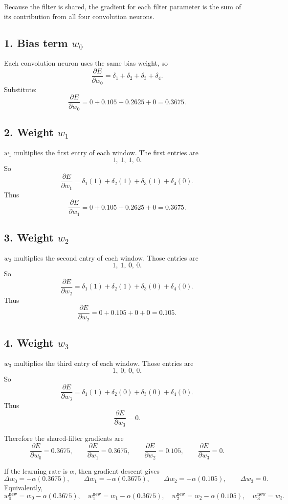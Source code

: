 \documentclass[11pt]{article}
\begin{document}
Because the filter is shared, the gradient for each filter parameter is the sum of its contribution from all four convolution neurons.

\subsection*{1. Bias term \(w_0\)}

Each convolution neuron uses the same bias weight, so
\[
\frac{\partial E}{\partial w_0}
=
\delta_1+\delta_2+\delta_3+\delta_4.
\]
Substitute:
\[
\frac{\partial E}{\partial w_0}
=0+0.105+0.2625+0=0.3675.
\]

\subsection*{2. Weight \(w_1\)}

\(w_1\) multiplies the first entry of each window. The first entries are
\[
1,\ 1,\ 1,\ 0.
\]
So
\[
\frac{\partial E}{\partial w_1}
=
\delta_1(1)+\delta_2(1)+\delta_3(1)+\delta_4(0).
\]
Thus
\[
\frac{\partial E}{\partial w_1}
=0+0.105+0.2625+0=0.3675.
\]

\subsection*{3. Weight \(w_2\)}

\(w_2\) multiplies the second entry of each window. Those entries are
\[
1,\ 1,\ 0,\ 0.
\]
So
\[
\frac{\partial E}{\partial w_2}
=
\delta_1(1)+\delta_2(1)+\delta_3(0)+\delta_4(0).
\]
Thus
\[
\frac{\partial E}{\partial w_2}=0+0.105+0+0=0.105.
\]

\subsection*{4. Weight \(w_3\)}

\(w_3\) multiplies the third entry of each window. Those entries are
\[
1,\ 0,\ 0,\ 0.
\]
So
\[
\frac{\partial E}{\partial w_3}
=
\delta_1(1)+\delta_2(0)+\delta_3(0)+\delta_4(0).
\]
Thus
\[
\frac{\partial E}{\partial w_3}=0.
\]

Therefore the shared-filter gradients are
\[
\boxed{
\frac{\partial E}{\partial w_0}=0.3675,\qquad
\frac{\partial E}{\partial w_1}=0.3675,\qquad
\frac{\partial E}{\partial w_2}=0.105,\qquad
\frac{\partial E}{\partial w_3}=0.
}
\]

If the learning rate is \(\alpha\), then gradient descent gives
\[
\Delta w_0=-\alpha(0.3675),\qquad
\Delta w_1=-\alpha(0.3675),\qquad
\Delta w_2=-\alpha(0.105),\qquad
\Delta w_3=0.
\]
Equivalently,
\[
w_0^{\text{new}}=w_0-\alpha(0.3675),\quad
w_1^{\text{new}}=w_1-\alpha(0.3675),\quad
w_2^{\text{new}}=w_2-\alpha(0.105),\quad
w_3^{\text{new}}=w_3.
\]
\end{document}
